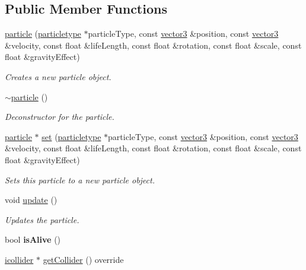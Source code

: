 \subsection*{Public Member Functions}
\begin{DoxyCompactItemize}
\item 
\hyperlink{classflounder_1_1particle_a031b89de2f5f74b55cc97209229eaccd}{particle} (\hyperlink{classflounder_1_1particletype}{particletype} $\ast$particle\+Type, const \hyperlink{classflounder_1_1vector3}{vector3} \&position, const \hyperlink{classflounder_1_1vector3}{vector3} \&velocity, const float \&life\+Length, const float \&rotation, const float \&scale, const float \&gravity\+Effect)
\begin{DoxyCompactList}\small\item\em Creates a new particle object. \end{DoxyCompactList}\item 
\hyperlink{classflounder_1_1particle_a156e09a44b655e9d64d90302852ae144}{$\sim$particle} ()
\begin{DoxyCompactList}\small\item\em Deconstructor for the particle. \end{DoxyCompactList}\item 
\hyperlink{classflounder_1_1particle}{particle} $\ast$ \hyperlink{classflounder_1_1particle_a6572109ef15a5cd352d1a8ded68123cb}{set} (\hyperlink{classflounder_1_1particletype}{particletype} $\ast$particle\+Type, const \hyperlink{classflounder_1_1vector3}{vector3} \&position, const \hyperlink{classflounder_1_1vector3}{vector3} \&velocity, const float \&life\+Length, const float \&rotation, const float \&scale, const float \&gravity\+Effect)
\begin{DoxyCompactList}\small\item\em Sets this particle to a new particle object. \end{DoxyCompactList}\item 
void \hyperlink{classflounder_1_1particle_ad524600c5aa2c2594896cf8702187e7e}{update} ()
\begin{DoxyCompactList}\small\item\em Updates the particle. \end{DoxyCompactList}\item 
\mbox{\label{classflounder_1_1particle_accf9e8afa49a6b0406256e09403106f0}} 
bool {\bfseries is\+Alive} ()
\item 
\hyperlink{classflounder_1_1icollider}{icollider} $\ast$ \hyperlink{classflounder_1_1particle_a158ec50298e711488720eaf36600f828}{get\+Collider} () override

\end{DoxyCompactItemize}
